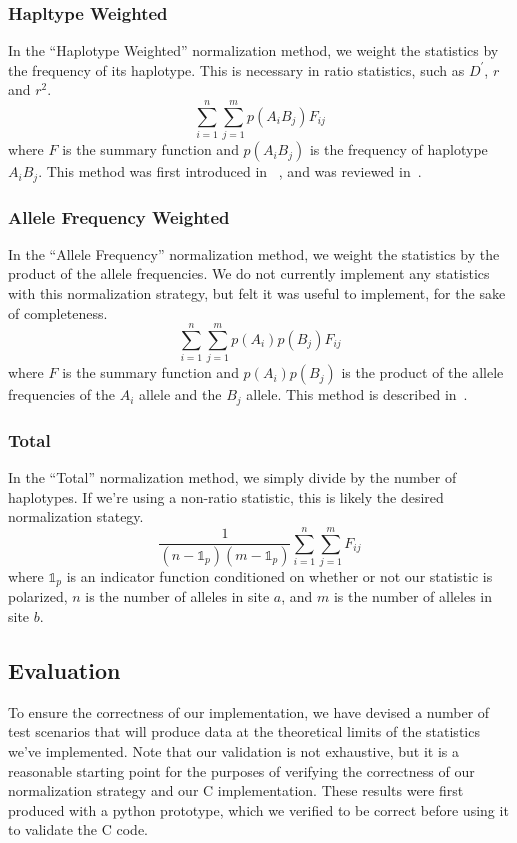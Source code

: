 \documentclass[12pt]{article}
\begin{document}
\subsubsection{Hapltype Weighted}
In the ``Haplotype Weighted'' normalization method, we weight the statistics by
the frequency of its haplotype. This is necessary in ratio statistics, such as
$D^{\prime}$, $r$ and $r^{2}$.
\[
  \sum_{i=1}^{n}\sum_{j=1}^{m}p(A_{i}B_{j})F_{ij}
\]
where $F$ is the summary function and $p(A_{i}B_{j})$ is the frequency of
haplotype $A_{i}B_{j}$. This method was first introduced in
~\cite{karlin_statistical_1981}, and was reviewed in~\cite{zhao2007evaluation}.

\subsubsection{Allele Frequency Weighted}
In the ``Allele Frequency'' normalization method, we weight the statistics by
the product of the allele frequencies. We do not currently implement any
statistics with this normalization strategy, but felt it was useful to
implement, for the sake of completeness.
\[
  \sum_{i=1}^{n}\sum_{j=1}^{m}p(A_{i})p(B_{j})F_{ij}
\]
where $F$ is the summary function and $p(A_{i})p(B_{j})$ is the product of the
allele frequencies of the $A_{i}$ allele and the $B_{j}$ allele. This method is
described in~\cite{hedrick1987gametic}.

\subsubsection{Total}
In the ``Total'' normalization method, we simply divide by the number of
haplotypes. If we're using a non-ratio statistic, this is likely the desired
normalization stategy.
\[
  \frac{1}{(n-\mathbb{1}_{p}) (m-\mathbb{1}_{p})}\sum_{i=1}^{n}\sum_{j=1}^{m}F_{ij}
\]
where $\mathbb{1}_{p}$ is an indicator function conditioned on whether or not
our statistic is polarized, $n$ is the number of alleles in site $a$, and $m$ is
the number of alleles in site $b$.

\subsection{Evaluation}
To ensure the correctness of our implementation, we have devised a number of
test scenarios that will produce data at the theoretical limits of the
statistics we've implemented. Note that our validation is not exhaustive, but it
is a reasonable starting point for the purposes of verifying the correctness of
our normalization strategy and our C implementation. These results were first
produced with a python prototype, which we verified to be correct before using
it to validate the C code.
\end{document}
